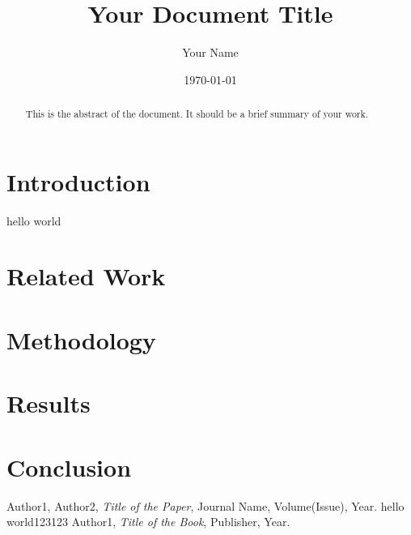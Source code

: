 \documentclass[a4paper,12pt]{article}  %
\title{Your Document Title}
\author{Your Name}
\date{\today}  %
\begin{document}
\maketitle
\newpage

\begin{abstract}
    This is the abstract of the document. It should be a brief summary of your work.
\end{abstract}
\newpage

\tableofcontents
\newpage


\section{Introduction}
\lipsum[1-3]  %
hello world
\section{Related Work}
\lipsum[4-6]

\section{Methodology}
\lipsum[7-9]

\section{Results}
\lipsum[10-12]

\section{Conclusion}
\lipsum[13]


\newpage
\begin{thebibliography}{9}
    Author1, Author2, \textit{Title of the Paper}, Journal Name, Volume(Issue), Year.
    hello world123123
    Author1, \textit{Title of the Book}, Publisher, Year.

\end{thebibliography}
\end{document}
